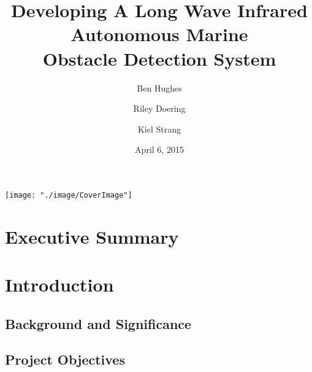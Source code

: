 \documentclass[twocolumn, aps, pra, 12pt, floatfix, showpacs]{revtex4-1}
\begin{document}
\title{Developing A Long Wave Infrared\\ Autonomous Marine\\ Obstacle Detection System}
\author{Ben Hughes}
\author{Riley Doering}
\author{Kiel Strang}
\noaffiliation
\date{April 6, 2015}
\maketitle

\onecolumngrid
\begin{center}
  \texttt{[image: "./image/CoverImage"]}
 \label{fig:test}
\end{center}


\newpage
{}

\section*{Executive Summary}


\newpage
\tableofcontents

\makeatletter
\let\toc@pre\relax
\let\toc@post\relax
\makeatother 

\newpage
\listoffigures
\listoftables

\clearpage
\newpage
{}


\section{\label{sec:introduction}Introduction}


\subsection{\label{sec:introduction:backgroundandsignificance}Background and Significance}


\subsection{\label{sec:introduction:projectobjectives}Project Objectives}

\end{document}
